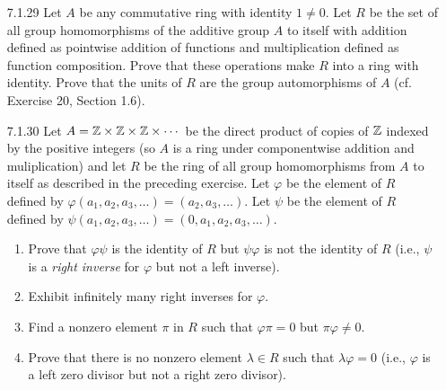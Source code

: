 \begin{enumerate}
\begin{enumerate}
                  \end{enumerate}
   \item[7.1.29]  Let $A$ be any commutative ring with identity $1 \neq 0$. Let
                  $R$ be the set of all group homomorphisms of the additive
                  group $A$ to itself with addition defined as pointwise
                  addition of functions and multiplication defined as function
                  composition. Prove that these operations make $R$ into a ring
                  with identity. Prove that the units of $R$ are the group
                  automorphisms of $A$ (cf. Exercise 20, Section 1.6).
   \item[7.1.30]  Let $A = \mathbb{Z} \times \mathbb{Z} \times \mathbb{Z} \times \cdots$ be the direct
                  product of copies of $\mathbb{Z}$ indexed by the positive integers (so
                  $A$ is a ring under componentwise addition and muliplication)
                  and let $R$ be the ring of all group homomorphisms from $A$ to
                  itself as described in the preceding exercise. Let $\varphi$
                  be the element of $R$ defined by
                  $\varphi(a_1, a_2, a_3, \ldots) = (a_2, a_3, \ldots)$. Let
                  $\psi$ be the element of $R$ defined by
                  $\psi(a_1, a_2, a_3, \ldots) = (0, a_1, a_2, a_3, \ldots)$.
                  \begin{enumerate}
                     \item Prove that $\varphi\psi$ is the identity of $R$ but
                           $\psi\varphi$ is not the identity of $R$ (i.e.,
                           $\psi$ is a \textit{right inverse} for $\varphi$ but
                           not a left inverse).
                     \item Exhibit infinitely many right inverses for $\varphi$.
                     \item Find a nonzero element $\pi$ in $R$ such that
                           $\varphi\pi = 0$ but $\pi\varphi \neq 0$.
                     \item Prove that there is no nonzero element
                           $\lambda \in R$ such that $\lambda\varphi = 0$ (i.e.,
                           $\varphi$ is a left zero divisor but not a right zero
                           divisor).
                  \end{enumerate}
\end{enumerate}
